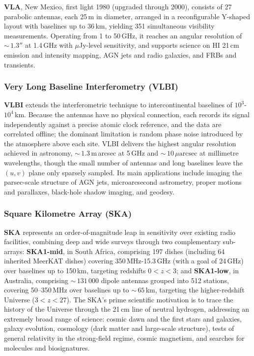 \textbf{VLA}, New Mexico, first light 1980 (upgraded through 2000), consists of 27 parabolic antennas, each 25\,m in diameter, arranged in a reconfigurable Y-shaped layout with baselines up to 36\,km, yielding 351 simultaneous visibility measurements. Operating from 1 to 50\,GHz, it reaches an angular resolution of ${\sim}\,1.3''$ at 1.4\,GHz with $\mu$Jy-level sensitivity, and supports science on HI 21\,cm emission and intensity mapping, AGN jets and radio galaxies, and FRBs and transients.

\subsubsection{Very Long Baseline Interferometry (VLBI)}

\textbf{VLBI} extends the interferometric technique to intercontinental baselines of $10^3$-$10^4$\,km. Because the antennas have no physical connection, each records its signal independently against a precise atomic clock reference, and the data are correlated offline; the dominant limitation is random phase noise introduced by the atmosphere above each site. VLBI delivers the highest angular resolution achieved in astronomy, ${\sim}\,1.3$\,m\,arcsec at 5\,GHz and ${\sim}\,10\,\mu\text{arcsec}$ at millimetre wavelengths, though the small number of antennas and long baselines leave the $(u,v)$ plane only sparsely sampled. Its main applications include imaging the parsec-scale structure of AGN jets, microarcsecond astrometry, proper motions and parallaxes, black-hole shadow imaging, and geodesy.

\subsubsection{Square Kilometre Array (SKA)}

\textbf{SKA} represents an order-of-magnitude leap in sensitivity over existing radio facilities, combining deep and wide surveys through two complementary sub-arrays: \textbf{SKA1-mid}, in South Africa, comprising 197 dishes (including 64 inherited MeerKAT dishes) covering 350\,MHz-15.3\,GHz (with a goal of 24\,GHz) over baselines up to 150\,km, targeting redshifts $0 < z < 3$; and \textbf{SKA1-low}, in Australia, comprising ${\sim}\,131\,000$ dipole antennas grouped into 512 stations, covering 50--350\,MHz over baselines up to ${\sim}\,65$\,km, targeting the higher-redshift Universe ($3 < z < 27$). The SKA's prime scientific motivation is to trace the history of the Universe through the 21\,cm line of neutral hydrogen, addressing an extremely broad range of science: cosmic dawn and the first stars and galaxies, galaxy evolution, cosmology (dark matter and large-scale structure), tests of general relativity in the strong-field regime, cosmic magnetism, and searches for molecules and biosignatures.

